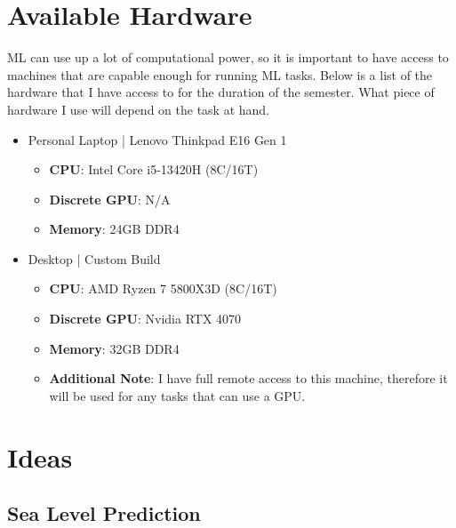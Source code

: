 \documentclass{article}
\begin{document}
\section{Available Hardware}
ML can use up a lot of computational power, so it is important to have access to machines that are capable enough for running ML tasks. Below is a list of the 
hardware that I have access to for the duration of the semester. What piece of hardware I use will depend on the task at hand.
\begin{itemize}
    \item Personal Laptop | Lenovo Thinkpad E16 Gen 1
    \begin{itemize}
        \item \textbf{CPU}: Intel Core i5-13420H (8C/16T)
        \item \textbf{Discrete GPU}: N/A
        \item \textbf{Memory}: 24GB DDR4
    \end{itemize}
    \item Desktop | Custom Build
    \begin{itemize}
        \item \textbf{CPU}: AMD Ryzen 7 5800X3D (8C/16T)
        \item \textbf{Discrete GPU}: Nvidia RTX 4070
        \item \textbf{Memory}: 32GB DDR4
        \item \textbf{Additional Note}: I have full remote access to this machine, therefore it will be used for any tasks that can use a GPU.
    \end{itemize}
\end{itemize} 

\section{Ideas}
\subsection{Sea Level Prediction}
\end{document}
